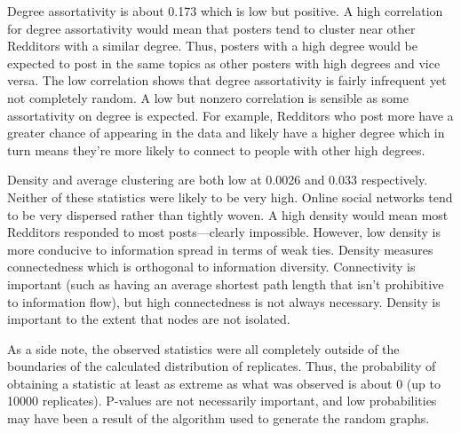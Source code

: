 \documentclass[12pt, a4paper]{article}
\begin{document}
Degree assortativity is about 0.173 which is low but positive. A high correlation for degree assortativity would mean that posters tend to cluster near other Redditors with a similar degree. Thus, posters with a high degree would be expected to post in the same topics as other posters with high degrees and vice versa. The low correlation shows that degree assortativity is fairly infrequent yet not completely random. A low but nonzero correlation is sensible as some assortativity on degree is expected. For example, Redditors who post more have a greater chance of appearing in the data and likely have a higher degree which in turn means they're more likely to connect to people with other high degrees.

Density and average clustering are both low at 0.0026 and 0.033 respectively. Neither of these statistics were likely to be very high. Online social networks tend to be very dispersed rather than tightly woven. A high density would mean most Redditors responded to most posts---clearly impossible. However, low density is more conducive to information spread in terms of weak ties. Density measures connectedness which is orthogonal to information diversity. Connectivity is important (such as having an average shortest path length that isn't prohibitive to information flow), but high connectedness is not always necessary. Density is important to the extent that nodes are not isolated.

As a side note, the observed statistics were all completely outside of the boundaries of the calculated distribution of replicates. Thus, the probability of obtaining a statistic at least as extreme as what was observed is about 0 (up to 10000 replicates). P-values are not necessarily important, and low probabilities may have been a result of the algorithm used to generate the random graphs.
\end{document}
